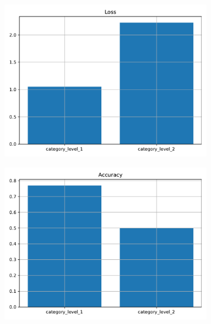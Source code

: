 \begin{figure}[htpb]
	\centering
	\begin{subfigure}{0.48\linewidth}
		\centering
		\includegraphics[width=\linewidth]{Images/final_loss_categories.pdf}
		\caption{}
	\end{subfigure}
	\begin{subfigure}{0.48\linewidth}
		\centering
		\includegraphics[width=\linewidth]{Images/final_accuracy_categories.pdf}
		\caption{}
	\end{subfigure}
	\caption{}
\end{figure}